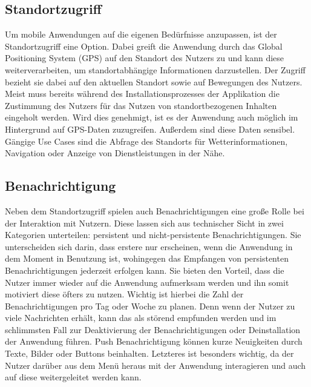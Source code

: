 \subsection{Standortzugriff}
Um mobile Anwendungen auf die eigenen Bedürfnisse anzupassen, ist der Standortzugriff eine Option. Dabei greift die Anwendung durch das Global Positioning System (GPS) auf den Standort des Nutzers zu und kann diese weiterverarbeiten, um standortabhängige Informationen darzustellen. Der Zugriff bezieht sie dabei auf den aktuellen Standort sowie auf Bewegungen des Nutzers. Meist muss bereits während des Installationsprozesses der Applikation die Zustimmung des Nutzers für das Nutzen von standortbezogenen Inhalten eingeholt werden. Wird dies genehmigt, ist es der Anwendung auch möglich im Hintergrund auf GPS-Daten zuzugreifen. Außerdem sind diese Daten sensibel.\\
Gängige Use Cases sind die Abfrage des Standorts für Wetterinformationen, Navigation oder Anzeige von Dienstleistungen in der Nähe.

\subsection{Benachrichtigung}
Neben dem Standortzugriff spielen auch Benachrichtigungen eine große Rolle bei der Interaktion mit Nutzern. Diese lassen sich aus technischer Sicht in zwei Kategorien unterteilen: persistent und nicht-persistente Benachrichtigungen. Sie unterscheiden sich darin, dass erstere nur erscheinen, wenn die Anwendung in dem Moment in Benutzung ist, wohingegen das Empfangen von persistenten Benachrichtigungen jederzeit erfolgen kann. Sie bieten den Vorteil, dass die Nutzer immer wieder auf die Anwendung aufmerksam werden und ihn somit motiviert diese öfters zu nutzen. Wichtig ist hierbei die Zahl der Benachrichtigungen pro Tag oder Woche zu planen. Denn wenn der Nutzer zu viele Nachrichten erhält, kann das als störend empfunden werden und im schlimmsten Fall zur Deaktivierung der Benachrichtigungen oder Deinstallation der Anwendung führen. Push Benachrichtigung können kurze Neuigkeiten durch Texte, Bilder oder Buttons beinhalten. Letzteres ist besonders wichtig, da der Nutzer darüber aus dem Menü heraus mit der Anwendung interagieren und auch auf diese weitergeleitet werden kann.


